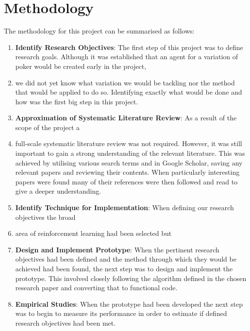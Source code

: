 \section{Methodology}\label{sec:methodology}

The methodology for this project can be summarised as follows:

\begin{enumerate}
    \item \textbf{Identify Research Objectives}: The first step of this project was to define research goals.
    Although it was established that an agent for a variation of poker would be created early in the project,
    \item we did not yet know what variation we would be tackling nor the method that would
    be applied to do so.
    Identifying exactly what would be done and how was the first big step in this project.
    \item \textbf{Approximation of Systematic Literature Review}: As a result of the scope of the project a
    \item full-scale systematic literature review was not required.
    However, it was still important to gain a strong understanding of the relevant literature.
    This was achieved by utilising various search terms and in Google Scholar, saving
    any relevant papers and reviewing their contents.
    When particularly interesting papers were found many of their references were then
    followed and read to give a deeper understanding.
    \item \textbf{Identify Technique for Implementation}: When defining our research objectives the broad
    \item area of reinforcement learning had been selected but
    \item \textbf{Design and Implement Prototype}: When the pertinent research objectives had been
    defined and the method through which they would be achieved had been found, the next step
    was to design and implement the prototype.
    This involved closely following the algorithm defined in the chosen research paper and
    converting that to functional code.
    \item \textbf{Empirical Studies}: When the prototype had been developed the next step was to begin to
    measure its performance in order to estimate if defined research objectives had been met.
\end{enumerate}

